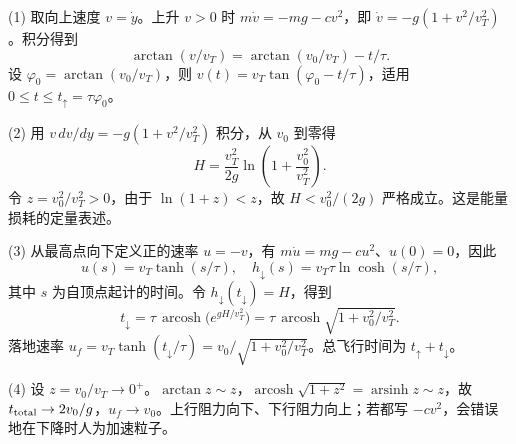 (1) 取向上速度 \(v=\dot y\)。上升 \(v>0\) 时 \(m\dot v=-mg-cv^2\)，即 \(\dot v=-g(1+v^2/v_T^2)\)。积分得到
\[
\arctan(v/v_T)=\arctan(v_0/v_T)-t/\tau .
\]
设 \(\varphi_0=\arctan(v_0/v_T)\)，则 \(v(t)=v_T\tan(\varphi_0-t/\tau)\)，适用 \(0\le t\le t_\uparrow=\tau\varphi_0\)。

(2) 用 \(v\,dv/dy=-g(1+v^2/v_T^2)\) 积分，从 \(v_0\) 到零得
\[
H=\frac{v_T^2}{2g}\ln\left(1+\frac{v_0^2}{v_T^2}\right).
\]
令 \(z=v_0^2/v_T^2>0\)，由于 \(\ln(1+z)<z\)，故 \(H<v_0^2/(2g)\) 严格成立。这是能量损耗的定量表述。

(3) 从最高点向下定义正的速率 \(u=-v\)，有 \(m\dot u=mg-cu^2\)、\(u(0)=0\)，因此
\[
u(s)=v_T\tanh(s/\tau),\quad h_\downarrow(s)=v_T\tau\ln\cosh(s/\tau),
\]
其中 \(s\) 为自顶点起计的时间。令 \(h_\downarrow(t_\downarrow)=H\)，得到
\[
t_\downarrow=\tau\,\operatorname{arcosh}\!\big(e^{gH/v_T^2}\big)
=\tau\,\operatorname{arcosh}\!\sqrt{1+v_0^2/v_T^2}.
\]
落地速率 \(u_f=v_T\tanh(t_\downarrow/\tau)
=v_0/\sqrt{1+v_0^2/v_T^2}\)。总飞行时间为 \(t_\uparrow+t_\downarrow\)。

(4) 设 \(z=v_0/v_T\to0^+\)。\(\arctan z\sim z\)，\(\operatorname{arcosh}\sqrt{1+z^2}=\operatorname{arsinh}z\sim z\)，故 \(t_{\rm total}\to2v_0/g\)，\(u_f\to v_0\)。上行阻力向下、下行阻力向上；若都写 \(-cv^2\)，会错误地在下降时人为加速粒子。
